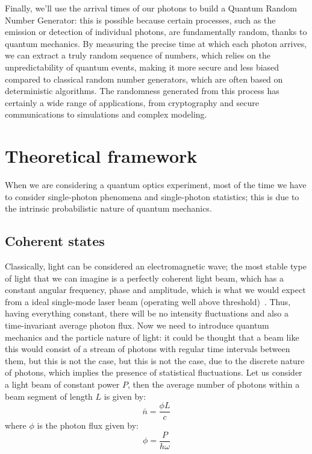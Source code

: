 \documentclass[prl,twocolumn]{revtex4-1}
\begin{document}
Finally, we'll use the arrival times of our photons to build a Quantum Random Number Generator: this is possible because certain processes, such as the emission or detection of individual photons, are fundamentally random, thanks to quantum mechanics. By measuring the precise time at which each photon arrives, we can extract a truly random sequence of numbers, which relies on the unpredictability of quantum events, making it more secure and less biased compared to classical random number generators, which are often based on deterministic algorithms. The randomness generated from this process has certainly a wide range of applications, from cryptography and secure communications to simulations and complex modeling.

\section{Theoretical framework}
When we are considering a quantum optics experiment, most of the time we have to consider single-photon phenomena and single-photon statistics; this is due to the intrinsic probabilistic nature of quantum mechanics. 

\subsection{Coherent states}
Classically, light can be considered an electromagnetic wave; the most stable type of light that we can imagine is a perfectly coherent light beam, which has a constant angular frequency, phase and amplitude, which is what we would expect from a ideal single-mode laser beam (operating well above threshold)~\cite{pap1}. Thus, having everything constant, there will be no intensity fluctuations and also a time-invariant average photon flux. Now we need to introduce quantum mechanics and the particle nature of light: it could be thought that a beam like this would consist of a stream of photons with regular time intervals between them, but this is not the case, but this is not the case, due to the discrete nature of photons, which implies the presence of statistical fluctuations. Let us consider a light beam of constant power $P$, then the average number of photons within a beam segment of length $L$ is given by:
%
\begin{equation}
    \bar{n} = \frac{\phi L}{c}
\end{equation}
%
where $\phi$ is the photon flux given by:
%
\begin{equation}
    \phi = \frac{P}{h\omega}
\end{equation}
\end{document}
